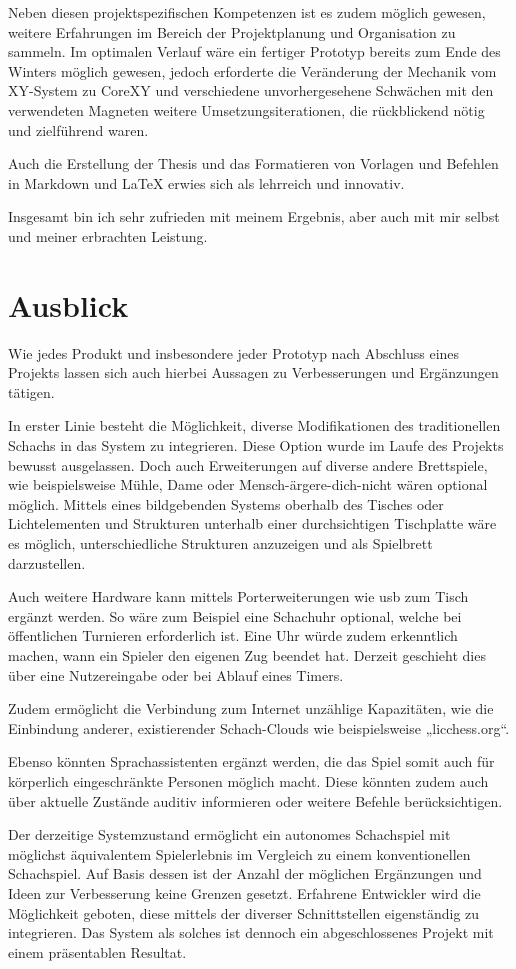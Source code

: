 Neben diesen projektspezifischen Kompetenzen ist es zudem möglich
gewesen, weitere Erfahrungen im Bereich der Projektplanung und
Organisation zu sammeln. Im optimalen Verlauf wäre ein fertiger Prototyp
bereits zum Ende des Winters möglich gewesen, jedoch erforderte die
Veränderung der Mechanik vom XY-System zu CoreXY und verschiedene
unvorhergesehene Schwächen mit den verwendeten Magneten weitere
Umsetzungsiterationen, die rückblickend nötig und zielführend waren.

Auch die Erstellung der Thesis und das Formatieren von Vorlagen und
Befehlen in Markdown und LaTeX erwies sich als lehrreich und innovativ.

Insgesamt bin ich sehr zufrieden mit meinem Ergebnis, aber auch mit mir
selbst und meiner erbrachten Leistung.

\hypertarget{ausblick}{%
\section{Ausblick}\label{ausblick}}

Wie jedes Produkt und insbesondere jeder Prototyp nach Abschluss eines
Projekts lassen sich auch hierbei Aussagen zu Verbesserungen und
Ergänzungen tätigen.

In erster Linie besteht die Möglichkeit, diverse Modifikationen des
traditionellen Schachs in das System zu integrieren. Diese Option wurde
im Laufe des Projekts bewusst ausgelassen. Doch auch Erweiterungen auf
diverse andere Brettspiele, wie beispielsweise Mühle, Dame oder
Mensch-ärgere-dich-nicht wären optional möglich. Mittels eines
bildgebenden Systems oberhalb des Tisches oder Lichtelementen und
Strukturen unterhalb einer durchsichtigen Tischplatte wäre es möglich,
unterschiedliche Strukturen anzuzeigen und als Spielbrett darzustellen.

Auch weitere Hardware kann mittels Porterweiterungen wie \gls{usb} zum
Tisch ergänzt werden. So wäre zum Beispiel eine Schachuhr optional,
welche bei öffentlichen Turnieren erforderlich ist. Eine Uhr würde zudem
erkenntlich machen, wann ein Spieler den eigenen Zug beendet hat.
Derzeit geschieht dies über eine Nutzereingabe oder bei Ablauf eines
Timers.

Zudem ermöglicht die Verbindung zum Internet unzählige Kapazitäten, wie
die Einbindung anderer, existierender Schach-Clouds wie beispielsweise
„licchess.org``.

Ebenso könnten Sprachassistenten ergänzt werden, die das Spiel somit
auch für körperlich eingeschränkte Personen möglich macht. Diese könnten
zudem auch über aktuelle Zustände auditiv informieren oder weitere
Befehle berücksichtigen.

Der derzeitige Systemzustand ermöglicht ein autonomes Schachspiel mit
möglichst äquivalentem Spielerlebnis im Vergleich zu einem
konventionellen Schachspiel. Auf Basis dessen ist der Anzahl der
möglichen Ergänzungen und Ideen zur Verbesserung keine Grenzen gesetzt.
Erfahrene Entwickler wird die Möglichkeit geboten, diese mittels der
diverser Schnittstellen eigenständig zu integrieren. Das System als
solches ist dennoch ein abgeschlossenes Projekt mit einem präsentablen
Resultat.



